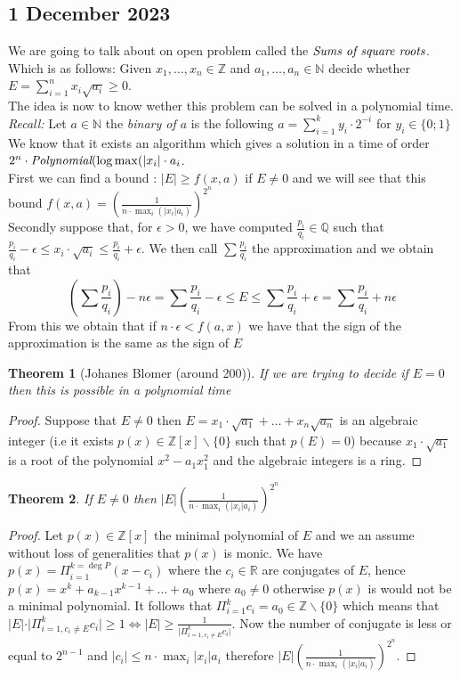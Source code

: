 \documentclass[a4paper,11pt,american]{article}
\newcommand{\N}{\mathbb{N}}
\newcommand{\Q}{\mathbb{Q}}
\newcommand{\R}{\mathbb{R}}
\newcommand{\Z}{\mathbb{Z}}
\theoremstyle{plain}
\newtheorem{theorem}{Theorem}
\theoremstyle{definition}
\begin{document}
\subsection*{1 December 2023}
We are going to talk about on open problem called the $\emph{Sums of square roots}$.\\
Which is  as follows:  Given
 $x_1,\dots,x_n \in \Z$ and  $a_1,\dots,a_n \in \N$
 decide whether $ E= \sum_{i=1}^n x_i \sqrt{a_i} \geq0$.\\
 The idea is now to know wether this problem can be solved in a polynomial time.\\
 \emph{Recall:} Let $a\in\N$ the \emph{binary of $a$} is the following $a=\sum_{i=1}^ky_i\cdot2^{-i}$ for $y_i\in\{0;1\}$\\
 We know that it exists an algorithm which gives a solution in a time of order $2^n\cdot\emph{Polynomial}(\log\max(\vert x_i\vert\cdot a_i$.\\
 First we can find a bound : $\vert E\vert \geq f(x,a)$ if $E\neq 0$ and we will see that this bound $f(x,a)=(\frac{1}{n\cdot\max_i(\vert x_i\vert a_i)})^{2^n}$\\
 Secondly suppose that, for $\epsilon>0$, we have computed $\frac{p_i}{q_i}\in\Q$ such that $\frac{p_i}{q_i}-\epsilon\leq x_i\cdot\sqrt{a_i}\leq \frac{p_i}{q_i}+ \epsilon$. We then call $\sum \frac{p_i}{q_i}$ the approximation and we obtain that $$(\sum\frac{p_i}{q_i})-n\epsilon=\sum\frac{p_i}{q_i}-\epsilon\leq E\leq \sum\frac{p_i}{q_i}+\epsilon=\sum\frac{p_i}{q_i}+n\epsilon$$
 From this we obtain that if $n\cdot\epsilon<f(a,x)$ we have that the sign of the approximation is the same as the sign of $E$\\
 \begin{theorem}[Johanes Blomer (around 200)]
     If we are trying to decide if $E=0$ then this is possible in a polynomial time
 \end{theorem}
 \begin{proof}
     Suppose that $E\neq 0$ then $E=x_1\cdot \sqrt{a_1}+\dots+ x_n\sqrt{a_n}$ is an algebraic integer (i.e it exists $p(x)\in\Z[x]\backslash\{0\}$ such that $p(E)=0$) because $x_1\cdot \sqrt{a_1}$ is a root of the polynomial $x^2-a_1x_1^2$ and the algebraic integers is a ring.
 \end{proof}
 \begin{theorem}
     If $E\neq 0$ then $\vert E\vert (\frac{1}{n\cdot\max_i(\vert x_i\vert a_i)})^{2^n}$ 
 \end{theorem}
 \begin{proof}
     Let $p(x)\in\Z[x]$ the minimal polynomial of $E$ and we an assume without loss of generalities that $p(x)$ is monic. We have $p(x)=\Pi^{k=\deg P}_{i=1}(x-c_i)$ where the $c_i\in \R$ are conjugates of $E$, hence $p(x)=x^k+a_{k-1}x^{k-1}+\dots +a_0$ where $a_0\neq 0$ otherwise $p(x)$ is would not be a minimal polynomial. It follows that $\Pi^k_{i=1}c_i=a_0\in\Z\backslash\{0\}$ which means that $\vert E\vert\cdot \vert\Pi_{i=1,c_i\neq E}^kc_i\vert\geq 1\iff \vert E\vert\geq\frac{1}{\vert\Pi_{i=1,c_i\neq E}^kc_i\vert}$. Now the number of conjugate is less or equal to $2^{n-1}$ and $\vert c_i\vert\leq n\cdot \max_i\vert x_i\vert a_i$ therefore $\vert E\vert (\frac{1}{n\cdot\max_i(\vert x_i\vert a_i)})^{2^n}$. 
 \end{proof}
\end{document}
